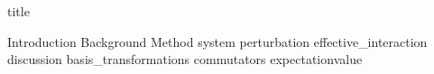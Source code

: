 \documentclass{article}
\begin{document}
{title}

\frontmatter

\tableofcontents
\newpage 
\listoffigures
\listoftables

\mainmatter

{Introduction}
{Background}
{Method}
{system}
{perturbation}
{effective_interaction}
{discussion}
\newpage
\printbibliography[heading = bibintoc]    %
\newpage 
\appendix
{basis_transformations}
{commutators}
{expectationvalue}
\end{document}
